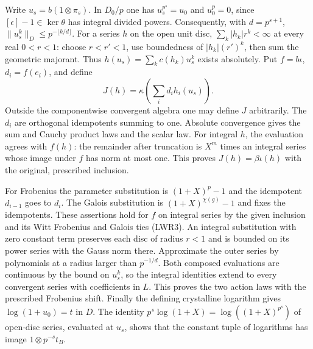 Write $u_s=b(1\otimes\pi_s)$. In $D_0/p$ one has
$u_s^{p^s}=u_0$ and $u_0^p=0$, since $[\epsilon]-1\in\ker\theta$
has integral divided powers. Consequently, with $d=p^{s+1}$,
$\|u_s^k\|_D\le p^{-\lfloor k/d\rfloor}$. For a series $h$ on the
open unit disc, $\sum_k|h_k|r^k<\infty$ at every real $0<r<1$:
choose $r<r'<1$, use boundedness of $|h_k|(r')^k$, then sum the
geometric majorant. Thus $h(u_s)=\sum_k c(h_k)u_s^k$ exists
absolutely. Put $f=b\iota$, $d_i=f(e_i)$, and define
\[
                J(h)=\kappa\!\left(\sum_i d_i h_i(u_s)\right).
\]
Outside the componentwise convergent algebra one may define $J$
arbitrarily. The $d_i$ are orthogonal idempotents summing to one.
Absolute convergence gives the sum and Cauchy product laws and
the scalar law. For integral $h$, the evaluation agrees with
$f(h)$: the remainder after truncation is $X^m$ times an integral
series whose image under $f$ has norm at most one. This proves
$J(h)=\beta\iota(h)$ with the original, prescribed inclusion.

For Frobenius the parameter substitution is $(1+X)^p-1$ and
the idempotent $d_{i-1}$ goes to $d_i$. The Galois substitution is
$(1+X)^{\chi(g)}-1$ and fixes the idempotents. These assertions
hold for $f$ on integral series by the given inclusion and its
Witt Frobenius and Galois ties (LWR3). An integral substitution
with zero constant term preserves each disc of radius $r<1$ and
is bounded on its power series with the Gauss norm there.
Approximate the outer series by polynomials at a radius larger
than $p^{-1/d}$. Both composed evaluations are continuous by the
bound on $u_s^k$, so the integral identities extend to every
convergent series with coefficients in $L$. This proves the two
action laws with the prescribed Frobenius shift. Finally the
defining crystalline logarithm gives $\log(1+u_0)=t$ in $D$.
The identity $p^s\log(1+X)=\log((1+X)^{p^s})$ of open-disc
series, evaluated at $u_s$, shows that the constant tuple of
logarithms has image $1\otimes p^{-s}t_B$.


